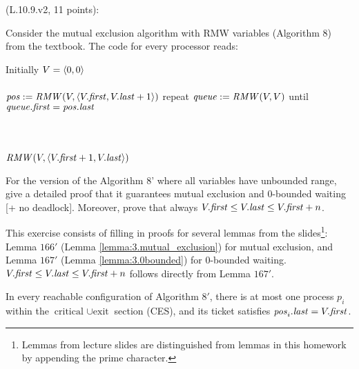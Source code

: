 \begin{Exc}{(L.10.9.v2, 11 points):}

Consider the mutual exclusion algorithm with RMW variables
(Algorithm 8) from the textbook. The code for every processor
reads:

\begin{code}%
\vspace*{-1cm}%
Initially $V=\langle 0,0 \rangle$\\
\\
\NL
\> $\mathit{pos} := \mathit{RMW}(V,\langle V.\mathit{first},V.\mathit{last}+1 \rangle)$\NL
\> repeat\NL
\>\> $\mathit{queue} := \mathit{RMW}(V,V)$\NL
\> until $\mathit{queue}.\mathit{first} = \mathit{pos}.\mathit{last}$\\
\\
\\
\\
\NL
\> $\mathit{RMW}(V,\langle V.\mathit{first}+1,V.\mathit{last} \rangle)$
\end{code}

For the version of the Algorithm 8' where all variables have unbounded
range, give a detailed proof that it guarantees mutual exclusion and
0-bounded waiting [+ no deadlock]. Moreover, prove that always
$V.\mathit{first} \leq V.\mathit{last} \leq V.\mathit{first}+n$.
\end{Exc}

This exercise consists of filling in proofs for several lemmas from the 
slides\footnote{Lemmas from lecture slides are distinguished from lemmas in this
homework by appending the prime character.}:
Lemma $166'$ (Lemma \ref{lemma:3.mutual_exclusion}) for mutual exclusion,
and Lemma $167'$ (Lemma \ref{lemma:3.0bounded}) for 0-bounded waiting. 
$V.\mathit{first} \leq V.\mathit{last} \leq V.\mathit{first}+n$ follows directly from Lemma $167'$.

\begin{lemma} \label{lemma:3.mutual_exclusion}
In every reachable configuration of Algorithm $8'$, there is at most one process
$p_i$ within the $\text{critical } \cup \text{exit}$ section (CES), and its ticket
satisfies $\mathit{pos}_i.\mathit{last} = V.\mathit{first}$.
\end{lemma}

